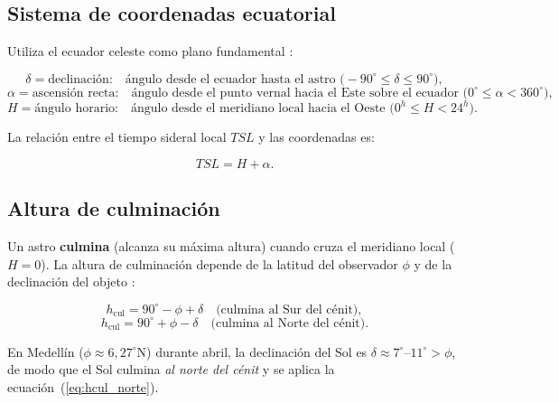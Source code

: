 \subsection{Sistema de coordenadas ecuatorial}

Utiliza el ecuador celeste como plano fundamental \citep{PortillaBarbosa2009,Karttunen2007}:

\begin{equation}
  \delta = \text{declinación:} \quad \text{ángulo desde el ecuador hasta el astro (}
  -90^\circ \leq \delta \leq 90^\circ\text{)},
\end{equation}
\begin{equation}
  \alpha = \text{ascensión recta:} \quad \text{ángulo desde el punto vernal hacia el
  Este sobre el ecuador (}0^\circ \leq \alpha < 360^\circ\text{)},
\end{equation}
\begin{equation}
  H = \text{ángulo horario:} \quad \text{ángulo desde el meridiano local hacia el Oeste
  (} 0^h \leq H < 24^h\text{)}.
\end{equation}

La relación entre el tiempo sideral local $TSL$ y las coordenadas es:

\begin{equation}
  TSL = H + \alpha.
  \label{eq:TSL}
\end{equation}

\subsection{Altura de culminación}

Un astro \textbf{culmina} (alcanza su máxima altura) cuando cruza el meridiano local
($H = 0$).
La altura de culminación depende de la latitud del observador $\phi$ y de la declinación
del objeto \citep{PortillaBarbosa2009}:

\begin{equation}
  h_\text{cul} = 90^\circ - \phi + \delta \quad \text{(culmina al Sur del cénit)},
  \label{eq:hcul_sur}
\end{equation}
\begin{equation}
  h_\text{cul} = 90^\circ + \phi - \delta \quad \text{(culmina al Norte del cénit)}.
  \label{eq:hcul_norte}
\end{equation}

En Medellín ($\phi \approx 6{,}27^\circ$N) durante abril, la declinación del Sol
es $\delta \approx 7^\circ$--$11^\circ > \phi$, de modo que el Sol culmina
\emph{al norte del cénit} y se aplica la ecuación~(\ref{eq:hcul_norte}).

